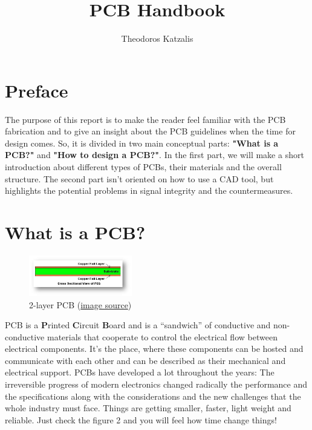 \documentclass[final]{cubedoc}
\title{PCB Handbook}
\author{Theodoros Katzalis}
\begin{document}
	
	\section{Preface}
	
	The purpose of this report is to make the reader feel familiar with the PCB fabrication  and to give an insight about the PCB guidelines when the time for design comes. So, it is divided in two main conceptual parts: \textbf{"What is a PCB?"} and \textbf{"How to design a PCB?"}. In the first part, we will make a short introduction about different types of PCBs, their materials and the overall structure. The second part isn't oriented on how to use a CAD tool, but highlights the potential problems in signal integrity and the countermeasures.
	
	\section{What is a PCB?}
	
	\begin{figure}
		\centering
		\includegraphics[width=0.4\textwidth]{assets/simple_2_layer_PCB.jpg}
		\caption{2-layer PCB \small{(\href{https://web.archive.org/web/20200813141542/https://www.edn.com/pcb-design-basics/}{image source})}}
		\label{fig:1}
	\end{figure}
	
	PCB is a \textbf{P}rinted \textbf{C}ircuit \textbf{B}oard and is  a “sandwich” of conductive and non-conductive materials that cooperate to control the electrical flow between electrical components. It’s the place, where these components can be hosted and communicate with each other and can be described as their mechanical and electrical support. PCBs have developed a lot throughout the years: The irreversible progress of modern electronics changed radically the performance and the specifications along with the considerations and the new challenges that the whole industry must face. Things are getting smaller, faster, light weight and reliable. Just check the figure 2 and you will feel how time change things!
	
	
	
\end{document}
